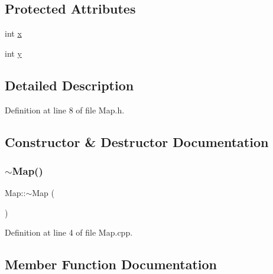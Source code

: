 \subsection*{Protected Attributes}
\begin{DoxyCompactItemize}
\item 
int \mbox{\hyperlink{class_world_architect_1_1_map_a1b4cf9200dca11577b4567584a1e62b8}{x}}
\item 
int \mbox{\hyperlink{class_world_architect_1_1_map_abd1e160bb8b03587caac4fb508c13307}{y}}
\end{DoxyCompactItemize}


\subsection{Detailed Description}


Definition at line 8 of file Map.\+h.



\subsection{Constructor \& Destructor Documentation}
\mbox{\label{class_world_architect_1_1_map_add0f5f3c2af54df264d4d257814a58a3}} 
\subsubsection{\texorpdfstring{$\sim$Map()}{~Map()}}
{\footnotesize\ttfamily Map\+::$\sim$\+Map (\begin{DoxyParamCaption}{ }\end{DoxyParamCaption})\hspace{0.3cm}{\ttfamily [pure virtual]}}



Definition at line 4 of file Map.\+cpp.



\subsection{Member Function Documentation}
\mbox{\label{class_world_architect_1_1_map_aeb09ef48c0b9cb0e0ff33b9ca4842829}} 
